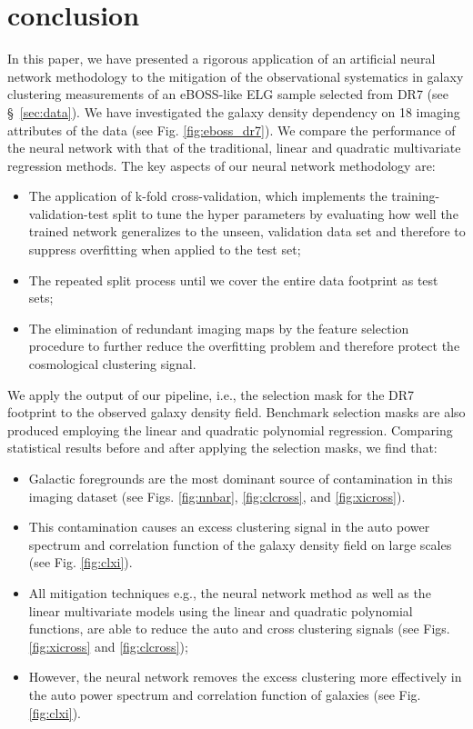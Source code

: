 \section{conclusion}\label{sec:conclusion}
In this paper, we have presented a rigorous application of an artificial neural network methodology to the mitigation of the observational systematics in galaxy clustering measurements of an eBOSS-like ELG sample selected from DR7 (see \S~\ref{sec:data}). We have investigated the galaxy density dependency on 18 imaging attributes of the data (see Fig. \ref{fig:eboss_dr7}). We compare the performance of the neural network with that of the traditional, linear and quadratic multivariate regression methods. The key aspects of our neural network methodology are:\\

\begin{itemize}
    \item The application of k-fold cross-validation, which implements the training-validation-test split to tune the hyper parameters by evaluating how well the trained network generalizes to the unseen,  validation data set and therefore to suppress overfitting when applied to the test set;
    
    \item The repeated split process until we cover the entire data footprint as test sets;
    
    \item The elimination of redundant imaging maps by the feature selection procedure to further reduce the overfitting problem and therefore protect the cosmological clustering signal.
\end{itemize}


We apply the output of our pipeline, i.e., the selection mask for the DR7 footprint to the observed galaxy density field. Benchmark selection masks are also produced employing the linear and quadratic polynomial regression. Comparing statistical results before and after applying the selection masks, we find that:\\
\begin{itemize}
    \item Galactic foregrounds are the most dominant source of contamination in this imaging dataset (see Figs. \ref{fig:nnbar}, \ref{fig:clcross}, and \ref{fig:xicross}).
    
    \item This contamination causes an excess clustering signal in the auto power spectrum and correlation function of the galaxy density field on large scales (see Fig. \ref{fig:clxi}).
    
    \item All mitigation techniques e.g., the neural network method as well as the linear multivariate models using the linear and quadratic polynomial functions, are able to reduce the auto and cross clustering signals (see Figs. \ref{fig:xicross} and \ref{fig:clcross});
    
    \item However, the neural network removes the excess clustering more effectively in the auto power spectrum and correlation function of galaxies (see Fig. \ref{fig:clxi}).
\end{itemize}


